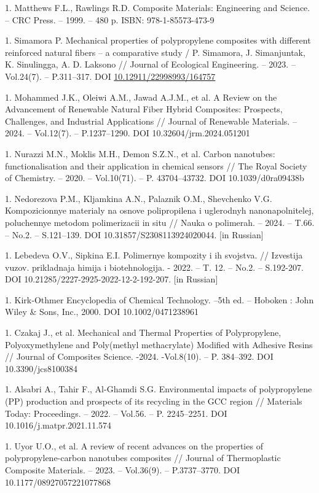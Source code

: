 1. Matthews F.L., Rawlings R.D. Composite Materials: Engineering and
Science. -- CRC Press. -- 1999. -- 480 p. ISBN: 978-1-85573-473-9

1. Simamora P. Mechanical properties of polypropylene composites with
different reinforced natural fibers -- a comparative study / P.
Simamora, J. Simanjuntak, K. Sinulingga, A. D. Laksono // Journal of
Ecological Engineering. -- 2023. -- Vol.24(7). -- P.311--317. DOI
\href{https://doi.org/10.12911/22998993/164757}{10.12911/22998993/164757}

1. Mohammed J.K., Oleiwi A.M., Jawad A.J.M., et al. A Review on the
Advancement of Renewable Natural Fiber Hybrid Composites: Prospects,
Challenges, and Industrial Applications // Journal of Renewable
Materials. -- 2024. -- Vol.12(7). -- P.1237--1290. DOI
10.32604/jrm.2024.051201

1. Nurazzi M.N., Moklis M.H., Demon S.Z.N., et al. Carbon nanotubes:
functionalisation and their application in chemical sensors // The
Royal Society of Chemistry. -- 2020. -- Vol.10(71). -- P.
43704--43732. DOI 10.1039/d0ra09438b

1. Nedorezova P.M., Kljamkina A.N., Palaznik O.M., Shevchenko V.G.
Kompozicionnye materialy na osnove polipropilena i uglerodnyh
nanonapolnitelej, poluchennye metodom polimerizacii in situ // Nauka o
polimerah. -- 2024. -- T.66. -- No.2. -- S.121--139. DOI
10.31857/S2308113924020044. {[}in Russian{]}

1. Lebedeva O.V., Sipkina E.I. Polimernye kompozity i ih svojstva. //
Izvestija vuzov. prikladnaja himija i biotehnologija. - 2022. -- T.
12. -- No.2. -- S.192-207. DOI 10.21285/2227-2925-2022-12-2-192-207.
{[}in Russian{]}

1. Kirk‐Othmer Encyclopedia of Chemical Technology. --5th ed. -- Hoboken
: John Wiley \& Sons, Inc., 2000. DOI 10.1002/0471238961

1. Czakaj J., et al. Mechanical and Thermal Properties of Polypropylene,
Polyoxymethylene and Poly(methyl methacrylate) Modified with Adhesive
Resins // Journal of Composites Science. -2024. -Vol.8(10). -- P.
384--392. DOI 10.3390/jcs8100384

1. Alsabri A., Tahir F., Al-Ghamdi S.G. Environmental impacts of
polypropylene (PP) production and prospects of its recycling in the
GCC region // Materials Today: Proceedings. -- 2022. -- Vol.56. -- P.
2245--2251. DOI 10.1016/j.matpr.2021.11.574

1. Uyor U.O., et al. A review of recent advances on the properties of
polypropylene-carbon nanotubes composites // Journal of Thermoplastic
Composite Materials. -- 2023. -- Vol.36(9). -- P.3737--3770. DOI
10.1177/08927057221077868

